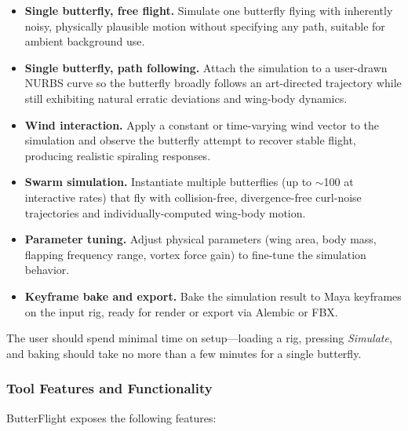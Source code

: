 \documentclass[12pt]{article}
\begin{document}
\begin{itemize}
  \item \textbf{Single butterfly, free flight.} Simulate one butterfly flying
    with inherently noisy, physically plausible motion without specifying any
    path, suitable for ambient background use.

  \item \textbf{Single butterfly, path following.} Attach the simulation to a
    user-drawn NURBS curve so the butterfly broadly follows an art-directed
    trajectory while still exhibiting natural erratic deviations and wing-body
    dynamics.

  \item \textbf{Wind interaction.} Apply a constant or time-varying wind vector
    to the simulation and observe the butterfly attempt to recover stable flight,
    producing realistic spiraling responses.

  \item \textbf{Swarm simulation.} Instantiate multiple butterflies (up to
    $\sim$100 at interactive rates) that fly with collision-free, divergence-free
    curl-noise trajectories and individually-computed wing-body motion.

  \item \textbf{Parameter tuning.} Adjust physical parameters
    (wing area, body mass, flapping frequency range, vortex force gain) to
    fine-tune the simulation behavior.

  \item \textbf{Keyframe bake and export.} Bake the simulation result to Maya
    keyframes on the input rig, ready for render or export via Alembic or FBX.
\end{itemize}

The user should spend minimal time on setup---loading a rig, pressing
\textit{Simulate}, and baking should take no more than a few minutes for a
single butterfly.

\subsubsection{Tool Features and Functionality}

ButterFlight exposes the following features:
\end{document}
